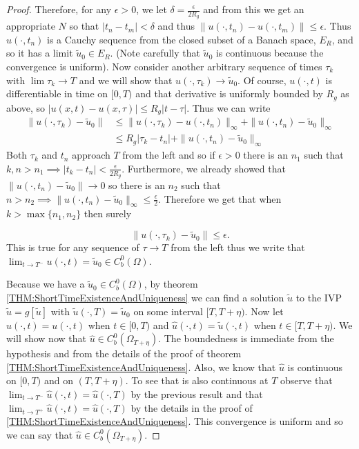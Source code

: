 \documentclass[aps,
preprint,
groupedaddress,
showkeys,
amsmath]{revtex4-2}
\begin{document}
\begin{proof}
        Therefore, for any $\epsilon>0$, we let $\delta=\frac{\epsilon}{2R_g}$ and from this we get an appropriate $N$ so that $|t_n-t_m|<\delta$ and thus $\|u(\cdot,t_n)-u(\cdot, t_m)\|\leq \epsilon$. Thus $u(\cdot, t_n)$ is a Cauchy sequence from the closed subset of a Banach space, $E_R$, and so it has a limit $\tilde{u}_0\in E_R$. (Note carefully that $\tilde{u}_0$ is continuous because the convergence is uniform). Now consider another arbitrary sequence of times $\tau_k$ with $\lim \tau_k\rightarrow T$ and we will show that $u(\cdot, \tau_k)\rightarrow \tilde{u}_0$. Of course, $u(\cdot,t)$ is differentiable in time on $[0,T)$ and that derivative is uniformly bounded by $R_g$ as above, so $|u(x,t)-u(x,\tau)|\leq R_g|t-\tau|$. Thus we can write 
        \begin{equation*}
            \begin{split}
                \|u(\cdot, \tau_k)-\tilde{u}_0\|&\leq \|u(\cdot, \tau_k)-u(\cdot, t_n)\|_\infty+\|u(\cdot,t_n)-\tilde{u}_0\|_\infty\\
                &\leq R_g|\tau_k-t_n|+\|u(\cdot,t_n)-\tilde{u}_0\|_\infty
            \end{split}
        \end{equation*}
        Both $\tau_k$ and $t_n$ approach $T$ from the left and so if $\epsilon>0$ there is an $n_1$ such that $k,n>n_1\implies |t_k-t_n|<\frac{\epsilon}{2R_g}$. Furthermore, we already showed that $\|u(\cdot,t_n)-\tilde{u}_0\|\rightarrow 0$ so there is an $n_2$ such that $ n>n_2\implies \|u(\cdot,t_n)-\tilde{u}_0\|_\infty \leq \frac{\epsilon}{2}$. Therefore we get that when $k>\max\{n_1,n_2\}$ then surely
        
       \[\|u(\cdot, \tau_k)-\tilde{u}_0\|\leq \epsilon.\]
        This is true for any sequence of $\tau\rightarrow T$ from the left thus we write that $\lim_{t\to T^-}u(\cdot,t)=\tilde{u}_0\in C^0_b(\Omega)$.
        
        
        Because we have a $\tilde{u}_0\in C^0_b(\Omega)$, by theorem \ref{THM:ShortTimeExistenceAndUniqueness} we can find a solution $\tilde u$ to the IVP $\tilde u=g[\tilde u]$ with $\tilde u(\cdot, T)=\tilde u _0$ on some interval $[T,T+\eta).$ Now let $\hat u(\cdot, t) = u(\cdot,t)$ when $t\in [0,T)$ and $\hat u(\cdot, t)=\tilde u(\cdot ,t)$ when $t\in [T,T+\eta)$. We will show now that $\hat u\in C^0_b(\Omega_{T+\eta}).$ The boundedness is immediate from the hypothesis and from the details of the proof of theorem \ref{THM:ShortTimeExistenceAndUniqueness}. Also, we know that $\hat{u}$ is continuous on $[0,T)$ and on $(T,T+\eta)$. To see that is also continuous at $T$ observe that $\lim_{t\rightarrow T^-}\hat{u}(\cdot, t)=\hat{u}(\cdot, T)$ by the previous result and that $\lim_{t\rightarrow T^+}\hat{u}(\cdot, t)=\hat{u}(\cdot, T)$ by the details in the proof of \ref{THM:ShortTimeExistenceAndUniqueness}. This convergence is uniform and so we can say that  $\hat u\in C^0_b(\Omega_{T+\eta}).$
        

\end{proof}
\end{document}
